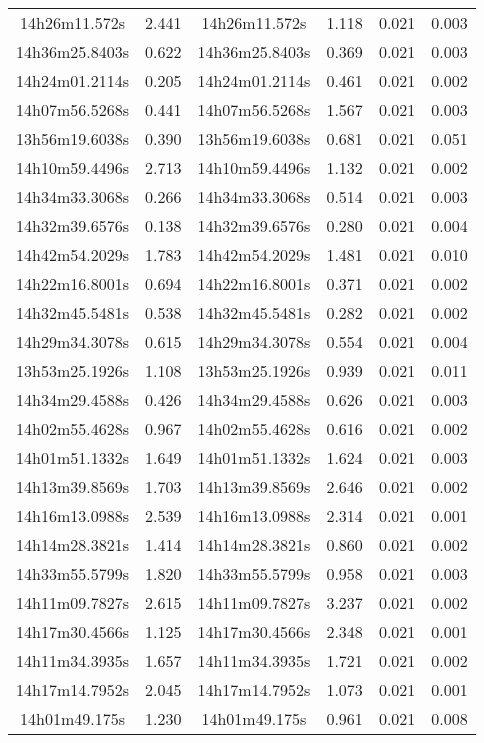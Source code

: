 \begin{table}
\begin{tabular}{cccccc}
14h26m11.572s & 2.441 & 14h26m11.572s & 1.118 & 0.021 & 0.003 \\
14h36m25.8403s & 0.622 & 14h36m25.8403s & 0.369 & 0.021 & 0.003 \\
14h24m01.2114s & 0.205 & 14h24m01.2114s & 0.461 & 0.021 & 0.002 \\
14h07m56.5268s & 0.441 & 14h07m56.5268s & 1.567 & 0.021 & 0.003 \\
13h56m19.6038s & 0.390 & 13h56m19.6038s & 0.681 & 0.021 & 0.051 \\
14h10m59.4496s & 2.713 & 14h10m59.4496s & 1.132 & 0.021 & 0.002 \\
14h34m33.3068s & 0.266 & 14h34m33.3068s & 0.514 & 0.021 & 0.003 \\
14h32m39.6576s & 0.138 & 14h32m39.6576s & 0.280 & 0.021 & 0.004 \\
14h42m54.2029s & 1.783 & 14h42m54.2029s & 1.481 & 0.021 & 0.010 \\
14h22m16.8001s & 0.694 & 14h22m16.8001s & 0.371 & 0.021 & 0.002 \\
14h32m45.5481s & 0.538 & 14h32m45.5481s & 0.282 & 0.021 & 0.002 \\
14h29m34.3078s & 0.615 & 14h29m34.3078s & 0.554 & 0.021 & 0.004 \\
13h53m25.1926s & 1.108 & 13h53m25.1926s & 0.939 & 0.021 & 0.011 \\
14h34m29.4588s & 0.426 & 14h34m29.4588s & 0.626 & 0.021 & 0.003 \\
14h02m55.4628s & 0.967 & 14h02m55.4628s & 0.616 & 0.021 & 0.002 \\
14h01m51.1332s & 1.649 & 14h01m51.1332s & 1.624 & 0.021 & 0.003 \\
14h13m39.8569s & 1.703 & 14h13m39.8569s & 2.646 & 0.021 & 0.002 \\
14h16m13.0988s & 2.539 & 14h16m13.0988s & 2.314 & 0.021 & 0.001 \\
14h14m28.3821s & 1.414 & 14h14m28.3821s & 0.860 & 0.021 & 0.002 \\
14h33m55.5799s & 1.820 & 14h33m55.5799s & 0.958 & 0.021 & 0.003 \\
14h11m09.7827s & 2.615 & 14h11m09.7827s & 3.237 & 0.021 & 0.002 \\
14h17m30.4566s & 1.125 & 14h17m30.4566s & 2.348 & 0.021 & 0.001 \\
14h11m34.3935s & 1.657 & 14h11m34.3935s & 1.721 & 0.021 & 0.002 \\
14h17m14.7952s & 2.045 & 14h17m14.7952s & 1.073 & 0.021 & 0.001 \\
14h01m49.175s & 1.230 & 14h01m49.175s & 0.961 & 0.021 & 0.008 \\

\end{tabular}
\end{table}
